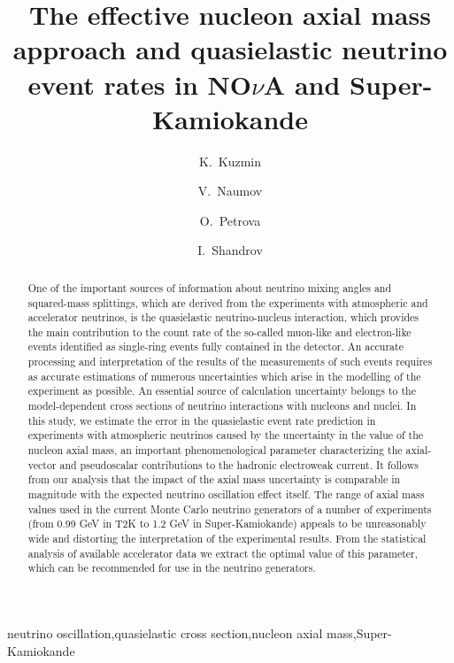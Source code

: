 \documentclass[preprint]{elsarticle}
\begin{document}
\begin{frontmatter}

\title{The effective nucleon axial mass approach and quasielastic neutrino event rates in NO$\nu$A and Super-Kamiokande}

\author[ITEP,JINR]{K.~Kuzmin}

\author[JINR]{V.~Naumov}

\author[JINR]{O.~Petrova}

\author[JINR]{I.~Shandrov}

\address[ITEP]{Institute for Theoretical and Experimental Physics, Bolshaya Cheremushkinskaya 25, RU-117218 Moscow, Russia}
\address[JINR]{Joint Institute for Nuclear Research, Joliot-Curie 6, RU-141980 Dubna, Russia}

\begin{abstract}
One of the important sources of information about neutrino mixing angles and squared-mass splittings, which are derived from the experiments with atmospheric and accelerator neutrinos, is the quasielastic neutrino-nucleus interaction, which provides the main contribution to the count rate of the so-called muon-like and electron-like events identified as single-ring events fully contained in the detector. An accurate processing and interpretation of the results of the measurements of such events requires as accurate estimations of numerous uncertainties which arise in the modelling of the experiment as possible. An essential source of calculation uncertainty belongs to the model-dependent cross sections of neutrino interactions with nucleons and nuclei. In this study, we estimate the error in the quasielastic event rate prediction in experiments with atmospheric neutrinos caused by the uncertainty in the value of the nucleon axial mass, an important phenomenological parameter characterizing the axial-vector and pseudoscalar contributions to the hadronic electroweak current. It follows from our analysis that  the impact of the axial mass uncertainty is comparable in magnitude with the expected neutrino oscillation effect itself. The range of axial mass values used in the current Monte Carlo neutrino generators of a number of experiments (from 0.99 GeV in T2K to 1.2 GeV in Super-Kamiokande) appeals to be unreasonably wide and distorting the interpretation of the experimental results. From the statistical analysis of available accelerator data we extract the optimal value of this parameter, which can be recommended for use in the neutrino generators.
\end{abstract}

\begin{keyword}
neutrino oscillation\sep quasielastic cross section\sep nucleon axial mass\sep Super-Kamiokande
\end{keyword}

\end{frontmatter}
\end{document}

